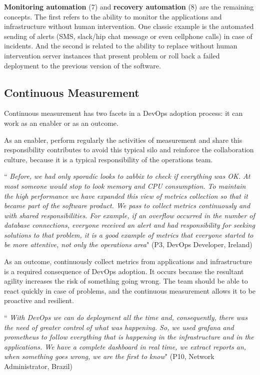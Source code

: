 \textbf{Monitoring automation} (7) and \textbf{recovery automation} (8) are the
remaining concepts. The first refers to the ability to monitor the
applications and infrastructure without human intervention. One classic example
is the automated sending of alerts (SMS, slack/hip chat message or even
cellphone calls) in case of incidents. And the second is related to the ability
to replace without human intervention server instances that present problem or
roll back a failed deployment to the previous version of the software.


\subsection{Continuous Measurement}
Continuous measurement has two facets in a DevOps adoption process: it can work
as an enabler or as an outcome.

As an enabler, perform regularly the activities of measurement and share this
responsibility contributes to avoid this typical silo and reinforce the
collaboration culture, because it is a typical responsibility of the operations
team.

\begin{mq}
``\emph{
Before, we had only sporadic looks to zabbix to check if everything was OK.
At most someone would stop to look memory and CPU consumption. To maintain the
high performance we have expanded this view of metrics collection so that it
became part of the software product. We pass to collect metrics continuously
and with shared responsibilities. For example, if an overflow occurred in the
number of database connections, everyone received an alert and had
responsibility for seeking solutions to that problem, it is a good example of
metrics that everyone started to be more attentive, not only the operations
area}" (P3, DevOps Developer, Ireland)
\end{mq}

As an outcome, continuously collect metrics from applications and
infrastructure is a required consequence of DevOps adoption. It occurs because
the resultant agility increases the risk of something going wrong. The team
should be able to react quickly in case of problems, and the continuous
measurement allows it to be proactive and resilient.

\begin{mq}
``\emph{
With DevOps we can do deployment all the time and, consequently, there was
the need of greater control of what was happening. So, we used grafana and
prometheus to follow everything that is happening in the infrastructure and in
the applications. We have a complete dashboard in real time, we extract reports
an, when something goes wrong, we are the first to know}" (P10, Network
Administrator, Brazil)
\end{mq}

